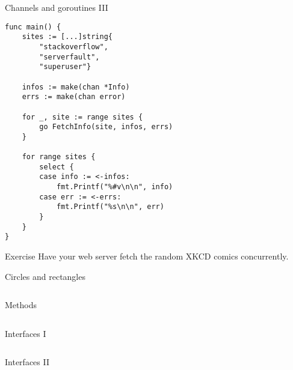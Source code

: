 \documentclass[10pt]{beamer}
\begin{document}
	
	\begin{frame}[fragile]{Channels and goroutines III}
		\begin{verbatim}
func main() {
	sites := [...]string{
		"stackoverflow",
		"serverfault",
		"superuser"}

	infos := make(chan *Info)
	errs := make(chan error)

	for _, site := range sites {
		go FetchInfo(site, infos, errs)
	}

	for range sites {
		select {
		case info := <-infos:
			fmt.Printf("%#v\n\n", info)
		case err := <-errs:
			fmt.Printf("%s\n\n", err)
		}
	}
}
		\end{verbatim}
	\end{frame}
	
	
	\begin{frame}[fragile]{Exercise}
		Have your web server fetch the random XKCD comics concurrently.
	\end{frame}
							
	
	\begin{frame}[fragile]{Circles and rectangles}
		\inputminted[fontsize=\scriptsize]{go}{code/15_shapes.go}
	\end{frame}
	
	
	\begin{frame}[fragile]{Methods}
		\inputminted[fontsize=\scriptsize]{go}{code/16_methods.go}
	\end{frame}
	
	
	\begin{frame}[fragile]{Interfaces I}
		\inputminted[fontsize=\scriptsize]{go}{code/17_interfaces.go}
	\end{frame}
	
	
	\begin{frame}[fragile]{Interfaces II}
		\inputminted[fontsize=\scriptsize,firstnumber=last]{go}{code/17b_interfaces.go}
	\end{frame}
	
\end{document}
